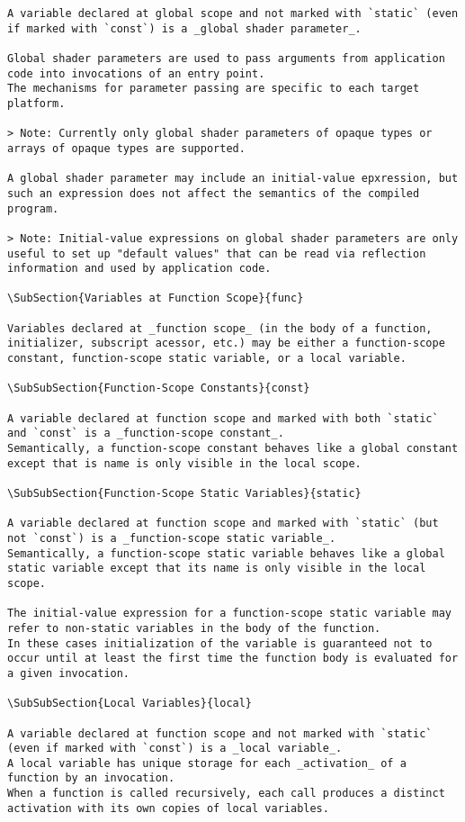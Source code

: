 \begin{verbatim}
A variable declared at global scope and not marked with `static` (even if marked with `const`) is a _global shader parameter_.

Global shader parameters are used to pass arguments from application code into invocations of an entry point.
The mechanisms for parameter passing are specific to each target platform.

> Note: Currently only global shader parameters of opaque types or arrays of opaque types are supported.

A global shader parameter may include an initial-value epxression, but such an expression does not affect the semantics of the compiled program.

> Note: Initial-value expressions on global shader parameters are only useful to set up "default values" that can be read via reflection information and used by application code.

\SubSection{Variables at Function Scope}{func}

Variables declared at _function scope_ (in the body of a function, initializer, subscript acessor, etc.) may be either a function-scope constant, function-scope static variable, or a local variable.

\SubSubSection{Function-Scope Constants}{const}

A variable declared at function scope and marked with both `static` and `const` is a _function-scope constant_.
Semantically, a function-scope constant behaves like a global constant except that is name is only visible in the local scope.

\SubSubSection{Function-Scope Static Variables}{static}

A variable declared at function scope and marked with `static` (but not `const`) is a _function-scope static variable_.
Semantically, a function-scope static variable behaves like a global static variable except that its name is only visible in the local scope.

The initial-value expression for a function-scope static variable may refer to non-static variables in the body of the function.
In these cases initialization of the variable is guaranteed not to occur until at least the first time the function body is evaluated for a given invocation.

\SubSubSection{Local Variables}{local}

A variable declared at function scope and not marked with `static` (even if marked with `const`) is a _local variable_.
A local variable has unique storage for each _activation_ of a function by an invocation.
When a function is called recursively, each call produces a distinct activation with its own copies of local variables.


\end{verbatim}

